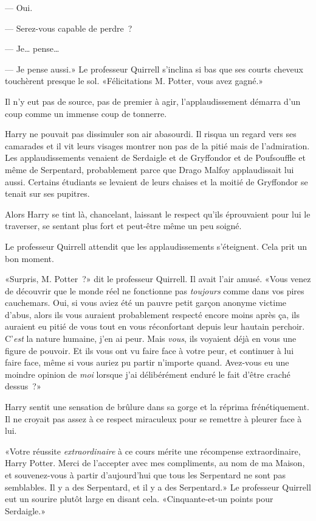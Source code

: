 --- Oui.

--- Serez-vous capable de perdre~?

--- Je… pense…

--- Je pense aussi.» Le professeur Quirrell s'inclina si bas que ses courts cheveux touchèrent presque le sol. «Félicitations M. Potter, vous avez gagné.»

Il n'y eut pas de source, pas de premier à agir, l'applaudissement démarra d'un coup comme un immense coup de tonnerre.

Harry ne pouvait pas dissimuler son air abasourdi. Il risqua un regard vers ses camarades et il vit leurs visages montrer non pas de la pitié mais de l'admiration. Les applaudissements venaient de Serdaigle et de Gryffondor et de Poufsouffle et même de Serpentard, probablement parce que Drago Malfoy applaudissait lui aussi. Certains étudiants se levaient de leurs chaises et la moitié de Gryffondor se tenait sur ses pupitres.

Alors Harry se tint là, chancelant, laissant le respect qu'ils éprouvaient pour lui le traverser, se sentant plus fort et peut-être même un peu soigné.

Le professeur Quirrell attendit que les applaudissements s'éteignent. Cela prit un bon moment.

«Surpris, M. Potter~?» dit le professeur Quirrell. Il avait l'air amusé. «Vous venez de découvrir que le monde réel ne fonctionne pas \emph{toujours} comme dans vos pires cauchemars. Oui, si vous aviez été un pauvre petit garçon anonyme victime d'abus, alors ils vous auraient probablement respecté encore moins après ça, ils auraient eu pitié de vous tout en vous réconfortant depuis leur hautain perchoir. C'\emph{est} la nature humaine, j'en ai peur. Mais \emph{vous}, ils voyaient déjà en vous une figure de pouvoir. Et ils vous ont vu faire face à votre peur, et continuer à lui faire face, même si vous auriez pu partir n'importe quand. Avez-vous eu une moindre opinion de \emph{moi} lorsque j'ai délibérément enduré le fait d'être craché dessus~?»

Harry sentit une sensation de brûlure dans sa gorge et la réprima frénétiquement. Il ne croyait pas assez à ce respect miraculeux pour se remettre à pleurer face à lui.

«Votre réussite \emph{extraordinaire} à ce cours mérite une récompense extraordinaire, Harry Potter. Merci de l'accepter avec mes compliments, au nom de ma Maison, et souvenez-vous à partir d'aujourd'hui que tous les Serpentard ne sont pas semblables. Il y a des Serpentard, et il y a des Serpentard.» Le professeur Quirrell eut un sourire plutôt large en disant cela. «Cinquante-et-un points pour Serdaigle.»

